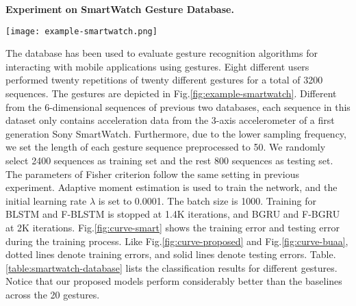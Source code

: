 \documentclass[review]{elsarticle}
\begin{document}
\textbf{Experiment on SmartWatch Gesture Database\;\cite{costante2014eusipco}.}
\begin{figure*}[htbp]
	\normalsize
	\centering
	\texttt{[image: example-smartwatch.png]}
	\\
	\caption{Examples of hand gestures in SmartWatch Database.}
	\label{fig:example-smartwatch}
	\vspace*{4pt}
\end{figure*}
The database has been used to evaluate gesture recognition algorithms for interacting with mobile applications using gestures. Eight different users performed twenty repetitions of twenty different gestures for a total of 3200 sequences. The gestures are depicted in Fig.\;\ref{fig:example-smartwatch}. Different from the 6-dimensional sequences of previous two databases, each sequence in this dataset only contains acceleration data from the 3-axis accelerometer of a first generation Sony SmartWatch. Furthermore, due to the lower sampling frequency, we set the length of each gesture sequence preprocessed to 50. We randomly select 2400 sequences as training set and the rest 800 sequences as testing set. The parameters of Fisher criterion follow the same setting in previous experiment. Adaptive moment estimation is used to train the network, and the initial learning rate $\lambda$ is set to 0.0001. The batch size is 1000. Training for BLSTM and F-BLSTM  is stopped at 1.4K iterations, and BGRU and F-BGRU at 2K iterations. {Fig.\;\ref{fig:curve-smart} shows the training error and testing error during the training process. Like Fig.\;\ref{fig:curve-proposed} and Fig.\;\ref{fig:curve-buaa}, dotted lines denote training errors, and solid lines denote testing errors. Table.\;\ref{table:smartwatch-database} lists the classification results for different gestures. Notice that our proposed models perform considerably better than the baselines across the 20 gestures.}
\end{document}
